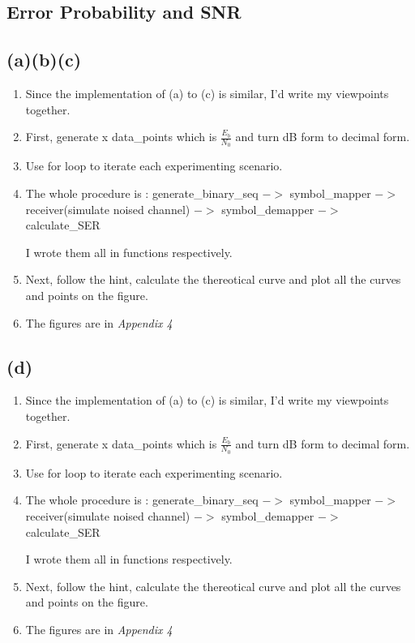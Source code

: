 \documentclass{article}
\begin{document}
\begin{CJK*}{UTF8}{bsmi}
\section{Error Probability and SNR}
\subsection{(a)(b)(c)}
\begin{enumerate}
    \item Since the implementation of (a) to (c) is similar, I'd write my viewpoints together.
    \item First, generate x data\_points which is $\frac{E_b}{N_0}$ and turn dB form to decimal form.
    \item Use for loop to iterate each experimenting scenario.
    \item The whole procedure is : generate\_binary\_seq $->$ symbol\_mapper $->$ receiver(simulate noised channel) $->$ symbol\_demapper $->$ calculate\_SER

    I wrote them all in functions respectively.
    \item Next, follow the hint, calculate the thereotical curve and plot all the curves and points on the figure.
    \item The figures are in \emph{Appendix 4}
\end{enumerate}

\subsection{(d)}
\begin{enumerate}
    \item Since the implementation of (a) to (c) is similar, I'd write my viewpoints together.
    \item First, generate x data\_points which is $\frac{E_b}{N_0}$ and turn dB form to decimal form.
    \item Use for loop to iterate each experimenting scenario.
    \item The whole procedure is : generate\_binary\_seq $->$ symbol\_mapper $->$ receiver(simulate noised channel) $->$ symbol\_demapper $->$ calculate\_SER

    I wrote them all in functions respectively.
    \item Next, follow the hint, calculate the thereotical curve and plot all the curves and points on the figure.
    \item The figures are in \emph{Appendix 4}
\end{enumerate}


\end{CJK*}
\end{document}
